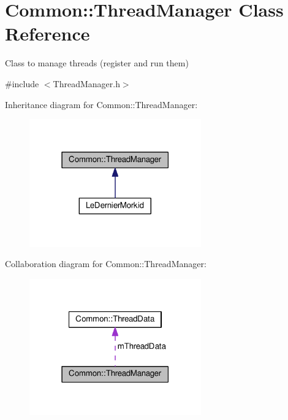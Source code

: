 \hypertarget{class_common_1_1_thread_manager}{}\section{Common\+:\+:Thread\+Manager Class Reference}
\label{class_common_1_1_thread_manager}


Class to manage threads (register and run them)  




{\ttfamily \#include $<$Thread\+Manager.\+h$>$}



Inheritance diagram for Common\+:\+:Thread\+Manager\+:\nopagebreak
\begin{figure}[H]
\begin{center}
\leavevmode
\includegraphics[width=210pt]{class_common_1_1_thread_manager__inherit__graph}
\end{center}
\end{figure}


Collaboration diagram for Common\+:\+:Thread\+Manager\+:\nopagebreak
\begin{figure}[H]
\begin{center}
\leavevmode
\includegraphics[width=210pt]{class_common_1_1_thread_manager__coll__graph}
\end{center}
\end{figure}
